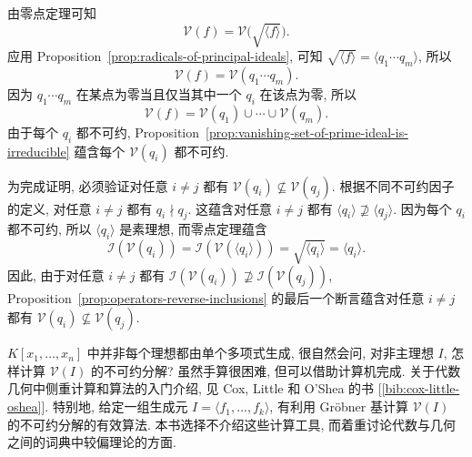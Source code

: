 \begin{Proof}
  由零点定理可知
  \[
    \mathcal{V}(f)=\mathcal{V}\bigl(\sqrt{\langle f\rangle}\bigr).
  \]
  应用 Proposition~\ref{prop:radicals-of-principal-ideals}, 可知 $\sqrt{\langle f\rangle}=\langle q_{1}\cdots q_{m}\rangle$, 所以
  \[
    \mathcal{V}(f)=\mathcal{V}(q_{1}\cdots q_{m}).
  \]
  因为 $q_{1}\cdots q_{m}$ 在某点为零当且仅当其中一个 $q_{i}$ 在该点为零, 所以
  \begin{equation}\label{eq:hypersurface-irreducible-decomposition}
    \mathcal{V}(f)=\mathcal{V}(q_{1})\cup\cdots\cup\mathcal{V}(q_{m}).
  \end{equation}
  由于每个 $q_{i}$ 都不可约, Proposition~\ref{prop:vanishing-set-of-prime-ideal-is-irreducible} 蕴含每个 $\mathcal{V}(q_{i})$ 都不可约.

  为完成证明, 必须验证对任意 $i\ne j$ 都有 $\mathcal{V}(q_{i})\nsubseteq\mathcal{V}(q_{j})$. 根据不同不可约因子的定义, 对任意 $i\ne j$ 都有 $q_{i}\nmid q_{j}$. 这蕴含对任意 $i\ne j$ 都有 $\langle q_{i}\rangle\nsupseteq\langle q_{j}\rangle$. 因为每个 $q_{i}$ 都不可约, 所以 $\langle q_{i}\rangle$ 是素理想, 而零点定理蕴含
  \[
    \mathcal{I}(\mathcal{V}(q_{i}))=\mathcal{I}(\mathcal{V}(\langle q_{i}\rangle))
      =\sqrt{\langle q_{i}\rangle}=\langle q_{i}\rangle.
  \]
  因此, 由于对任意 $i\ne j$ 都有 $\mathcal{I}(\mathcal{V}(q_{i}))\nsupseteq\mathcal{I}(\mathcal{V}(q_{j}))$, Proposition~\ref{prop:operators-reverse-inclusions} 的最后一个断言蕴含对任意 $i\ne j$ 都有 $\mathcal{V}(q_{i})\nsubseteq\mathcal{V}(q_{j})$.
\end{Proof}

\BookPairedNote
  {$K[x_{1},\ldots,x_{n}]$ 中并非每个理想都由单个多项式生成, 很自然会问, 对非主理想 $I$, 怎样计算 $\mathcal{V}(I)$ 的不可约分解? 虽然手算很困难, 但可以借助计算机完成.}
  {关于代数几何中侧重计算和算法的入门介绍, 见 Cox, Little 和 O’Shea 的书 [\ref{bib:cox-little-oshea}].}
\noindent 特别地, 给定一组生成元 $I=\langle f_{1},\ldots,f_{k}\rangle$, 有利用 Gröbner 基计算 $\mathcal{V}(I)$ 的不可约分解的有效算法. 本书选择不介绍这些计算工具, 而着重讨论代数与几何之间的词典中较偏理论的方面.

